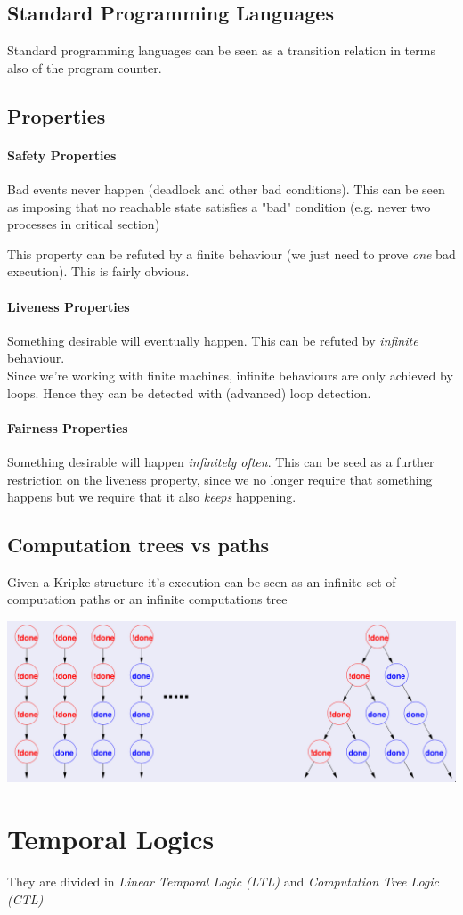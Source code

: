 \documentclass{article}
\begin{document}
\subsection{Standard Programming Languages}
Standard programming languages can be seen as a transition relation in terms also of the program counter.

\subsection{Properties}
\paragraph{Safety Properties}
Bad events never happen (deadlock and other bad conditions). This can be seen as imposing that no reachable state satisfies a "bad" condition (e.g. never two processes in critical section)

This property can be refuted by a finite behaviour (we just need to prove \textit{one} bad execution). This is fairly obvious.

\paragraph{Liveness Properties}
Something desirable will eventually happen. This can be refuted by \textit{infinite} behaviour.\\
Since we're working with finite machines, infinite behaviours are only achieved by loops. Hence they can be detected with (advanced) loop detection.

\paragraph{Fairness Properties}
Something desirable will happen \textit{infinitely often}. This can be seed as a further restriction on the liveness property, since we no longer require that something happens but we require that it also \textit{keeps} happening.

\subsection{Computation trees vs paths}
Given a Kripke structure it's execution can be seen as an infinite set of computation paths or an infinite computations tree
\begin{center}
    \includegraphics[width=0.8\linewidth]{images/pathVsTree.png}
\end{center}

\section{Temporal Logics}
They are divided in \textit{Linear Temporal Logic (LTL)} and \textit{Computation Tree Logic (CTL)}
\end{document}
